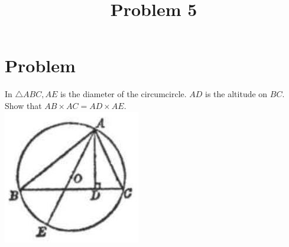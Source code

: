 \documentclass{article}
\title{Problem 5}
\date{}
\begin{document}
\maketitle

\section*{Problem}
In \(\triangle A B C, A E\) is the diameter of the circumcircle. \(A D\) is the altitude on \(B C\). Show that \(A B \times A C=A D \times A E\).\\
\centering
\includegraphics[width=\textwidth]{images/169(1).jpg}
\end{document}
